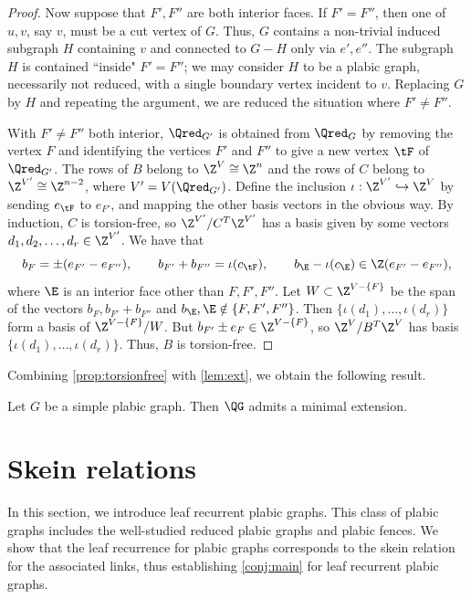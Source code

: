 \begin{proof}
Now suppose that $F',F''$ are both interior faces.  If $F' = F''$, then one of $u,v$, say $v$, must be a cut vertex of $G$.  Thus, $G$ contains a non-trivial induced subgraph $H$ containing $v$ and connected to $G-H$ only via $e',e''$.  The subgraph $H$ is contained ``inside" $F'=F''$; we may consider $H$ to be a plabic graph, necessarily not reduced, with a single boundary vertex incident to $v$.  Replacing $G$ by $H$ and repeating the argument, we are reduced the situation where $F' \neq F''$.

With $F' \neq F''$ both interior, $\Qred_{G'}$ is obtained from $\Qred_G$ by removing the vertex $F$ and identifying the vertices $F'$ and $F''$ to give a new vertex $\tF$ of $\Qred_{G'}$.  The rows of $B$ belong to $\Z^V \cong \Z^n$ and the rows of $C$ belong to $\Z^{V'} \cong \Z^{n-2}$, where $V' = V(\Qred_{G'})$.  Define the inclusion $\iota: \Z^{V'} \hookrightarrow \Z^V$ by sending $e_{\tF}$ to $e_{F'}$, and mapping the other basis vectors in the obvious way.  By induction, $C$ is torsion-free, so $\Z^{V'}/C^T\Z^{V'}$ has a basis given by some vectors $d_1,d_2,\ldots,d_r \in \Z^{V'}$.  We have that 
$$
b_F = \pm(e_{F'} - e_{F''}), \qquad b_{F'} +b_{F''} = \iota(c_{\tF}), \qquad b_\E - \iota(c_\E) \in \Z(e_{F'} - e_{F''}),
$$
where $\E$ is an interior face other than $F,F',F''$.  Let $W \subset \Z^{V - \{F\}}$ be the span of the vectors $b_F, b_{F'} +b_{F''}$ and $b_\E, \E \notin \{F,F',F''\}$.  Then $\{\iota(d_1),\ldots,\iota(d_r)\}$ form a basis of $\Z^{V- \{F\}}/W$.
But $b_{F'} \pm e_F \in\Z^{V - \{F\}}$, so $\Z^V/B^T\Z^V$ has basis $\{\iota(d_1),\ldots,\iota(d_r)\}$.  Thus, $B$ is torsion-free.
\end{proof}
Combining \cref{prop:torsionfree} with \cref{lem:ext}, we obtain the following result.
\begin{corollary}\label{cor:ext_simple}
Let $G$ be a simple plabic graph. Then $\QG$ admits a minimal extension.
\end{corollary}

\section{Skein relations}
In this section, we introduce leaf recurrent plabic graphs.  This class of plabic graphs includes the well-studied reduced plabic graphs and plabic fences.  We show that the leaf recurrence for plabic graphs corresponds to the skein relation for the associated links, thus establishing \cref{conj:main} for leaf recurrent plabic graphs.

